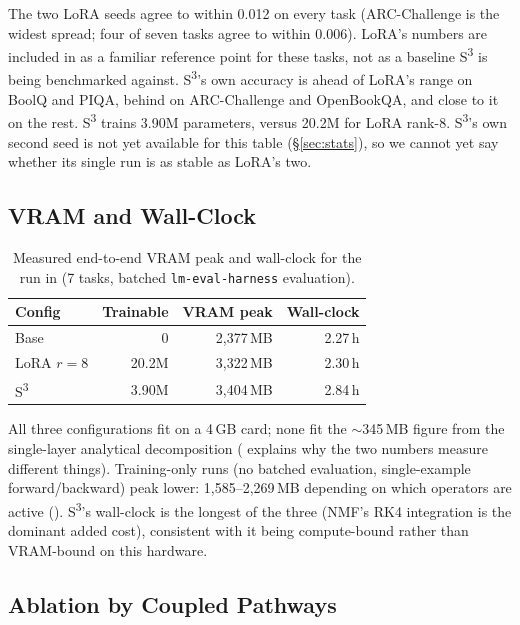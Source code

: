 \documentclass{scpe}
\newcommand{\sthree}{S\textsuperscript{3}}
\begin{document}
The two LoRA seeds agree to within 0.012 on every task (ARC-Challenge is the widest spread; four of seven tasks agree to within 0.006). LoRA's numbers are included in  as a familiar reference point for these tasks, not as a baseline \sthree{} is being benchmarked against. \sthree{}'s own accuracy is ahead of LoRA's range on BoolQ and PIQA, behind on ARC-Challenge and OpenBookQA, and close to it on the rest. \sthree{} trains 3.90M parameters, versus 20.2M for LoRA rank-8. \sthree{}'s own second seed is not yet available for this table (\S\ref{sec:stats}), so we cannot yet say whether its single run is as stable as LoRA's two.

\subsection{VRAM and Wall-Clock}

\begin{table}[t]
\centering
\caption{Measured end-to-end VRAM peak and wall-clock for the run in  (7 tasks, batched \texttt{lm-eval-harness} evaluation).}
\label{tab:vram}
\footnotesize
\setlength{\tabcolsep}{4pt}
\begin{tabular}{@{}lrrr@{}}
\toprule
\textbf{Config} & \textbf{Trainable} & \textbf{VRAM peak} & \textbf{Wall-clock} \\
\midrule
Base           & 0            & 2{,}377\,MB & 2.27\,h \\
LoRA $r{=}8$   & 20.2M        & 3{,}322\,MB & 2.30\,h \\
\sthree{}      & 3.90M        & 3{,}404\,MB & 2.84\,h \\
\bottomrule
\end{tabular}
\end{table}

All three configurations fit on a 4\,GB card; none fit the $\sim$345\,MB figure from the single-layer analytical decomposition ( explains why the two numbers measure different things). Training-only runs (no batched evaluation, single-example forward/backward) peak lower: 1{,}585--2{,}269\,MB depending on which operators are active (). \sthree{}'s wall-clock is the longest of the three (NMF's RK4 integration is the dominant added cost), consistent with it being compute-bound rather than VRAM-bound on this hardware.

\subsection{Ablation by Coupled Pathways}
\label{sec:pathways}
\end{document}
